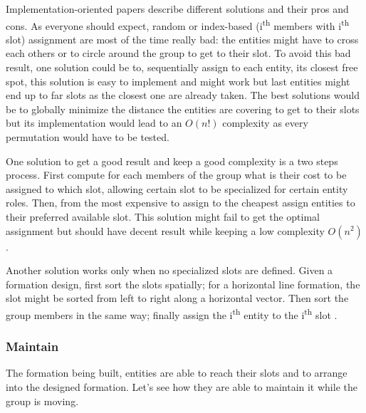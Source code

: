\documentclass[a4paper,titlepage]{article}
\begin{document}
Implementation-oriented papers \cite{Dawson:2002vd,Millington:2006wz} describe different solutions and their pros and cons. As everyone should expect, random or index-based (i\textsuperscript{th} members with i\textsuperscript{th} slot) assignment are most of the time really bad: the entities might have to cross each others or to circle around the group to get to their slot. To avoid this bad result, one solution could be to, sequentially assign to each entity, its closest free spot, this solution is easy to implement and might work but last entities might end up to far slots as the closest one are already taken. The best solutions would be to globally minimize the distance the entities are covering to get to their slots but its implementation would lead to an $O(n!)$ complexity as every permutation would have to be tested. 

One solution to get a good result and keep a good complexity is a two steps process. First compute for each members of the group what is their cost to be assigned to which slot, allowing certain slot to be specialized for certain entity roles. Then, from the most expensive to assign to the cheapest assign entities to their preferred available slot. This solution might fail to get the optimal assignment but should have decent result while keeping a low complexity $O(n^2)$
\cite{Millington:2006wz}.

Another solution works only when no specialized slots are defined. Given a formation design, first sort the slots spatially; for a horizontal line formation, the slot might be sorted from left to right along a horizontal vector. Then sort the group members in the same way; finally assign the i\textsuperscript{th} entity to the i\textsuperscript{th} slot \cite{Dawson:2002vd}.

\subsubsection{Maintain}

The formation being built, entities are able to reach their slots and to arrange into the designed formation. Let’s see how they are able to maintain it while the group is moving.
\end{document}
